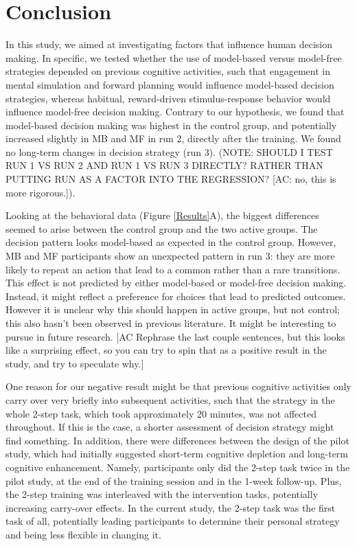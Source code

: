 \documentclass[11pt]{article} %
\begin{document}
\section{Conclusion}
In this study, we aimed at investigating factors that influence human decision making. In specific, we tested whether the use of model-based versus model-free strategies depended on previous cognitive activities, such that engagement in mental simulation and forward planning would influence model-based decision strategies, whereas habitual, reward-driven stimulus-response behavior would influence model-free decision making. Contrary to our hypothesis, we found that model-based decision making was highest in the control group, and potentially increased slightly in MB and MF in run 2, directly after the training. We found no long-term changes in decision strategy (run 3). (NOTE: SHOULD I TEST RUN 1 VS RUN 2 AND RUN 1 VS RUN 3 DIRECTLY? RATHER THAN PUTTING RUN AS A FACTOR INTO THE REGRESSION? [AC: no, this is more rigorous.]).

Looking at the behavioral data (Figure \ref{Results}A), the biggest differences seemed to arise between the control group and the two active groups. The decision pattern looks model-based as expected in the control group. However, MB and MF participants show an unexpected pattern in run 3: they are more likely to repeat an action that lead to a common rather than a rare transitions. This effect is not predicted by either model-based or model-free decision making. Instead, it might reflect a preference for choices that lead to predicted outcomes. However it is unclear why this should happen in active groups, but not control; this also hasn't been observed in previous literature. It might be interesting to pursue in future research. [AC Rephrase the last couple sentences, but this looks like a surprising effect, so you can try to spin that as a positive result in the study, and try to speculate why.]%

One reason for our negative result might be that previous cognitive activities only carry over very briefly into subsequent activities, such that the strategy in the whole 2-step task, which took approximately 20 minutes, was not affected throughout. If this is the case, a shorter assessment of decision strategy might find something. In addition, there were differences between the design of the pilot study, which had initially suggested short-term cognitive depletion and long-term cognitive enhancement. Namely, participants only did the 2-step task twice in the pilot study, at the end of the training session and in the 1-week follow-up. Plus, the 2-step training was interleaved with the intervention tasks, potentially increasing carry-over effects. In the current study, the 2-step task was the first task of all, potentially leading participants to determine their personal strategy and being less flexible in changing it.
\end{document}
